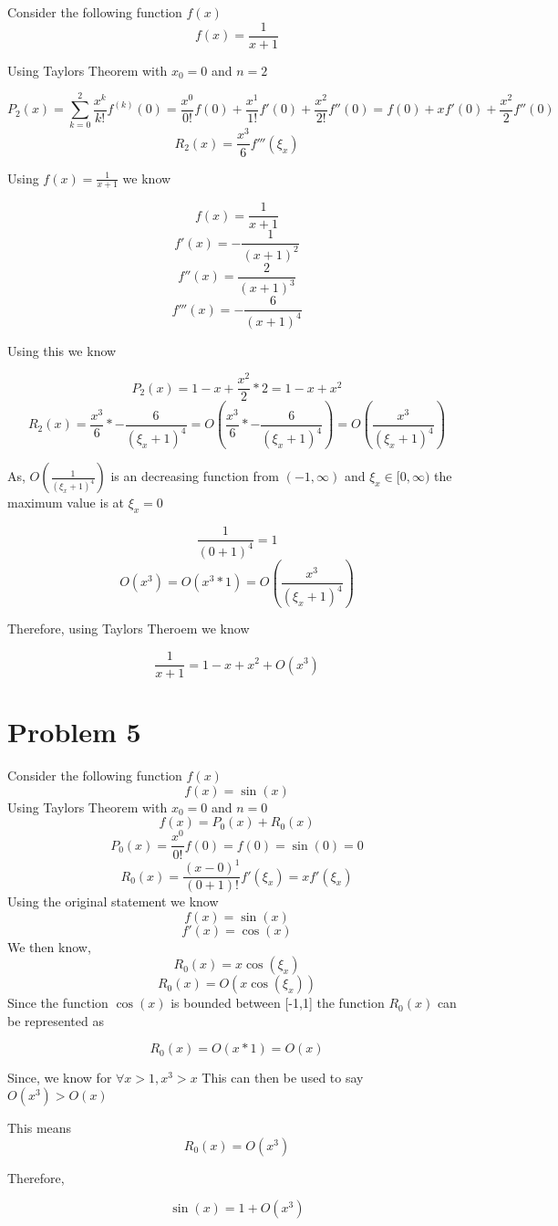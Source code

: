 \documentclass[]{article}
\begin{document}
Consider the following function $f(x)$
\[ f(x) = \frac{1}{x + 1} \]

Using Taylors Theorem with $x_0 = 0$ and $n = 2$

\[P_2(x) = \sum_{k=0}^{2} \frac{x^k}{k!} f^{(k)}(0) = \frac{x^0}{0!} f(0) + \frac{x^{1}}{1!}f'(0) + \frac{x^2}{2!}f''(0)= f(0) + xf'(0) + \frac{x^2}{2}f''(0)\]
\[R_2(x) = {\frac{x^3}{6}f'''(\xi_x)}\]

Using $f(x) = \frac{1}{x+1}$ we know

\[f(x) = \frac{1}{x+1}\]
\[f'(x) = -\frac{1}{(x+1)^2}\]
\[f''(x) = \frac{2}{(x+1)^3}\]
\[f'''(x) = -\frac{6}{(x+1)^4}\]

Using this we know

\[P_2(x) = 1 - x + \frac{x^2}{2}*2 = 1 - x + {x^2}\]
\[R_2(x) = \frac{x^3}{6} * -\frac{6}{(\xi_x+1)^4} = O(\frac{x^3}{6} * -\frac{6}{(\xi_x+1)^4}) = O(\frac{x^3}{(\xi_x+1)^4})\]

As, $ O(\frac{1}{(\xi_x+1)^4})$ is an decreasing function from $(-1 , \infty)$ and $\xi_x \in [0 ,\infty)$ the maximum value is at $\xi_x = 0$

\[\frac{1}{(0+1)^4} = 1\]
\[O(x^3) = O(x^3 * 1) = O(\frac{x^3}{(\xi_x+1)^4})\]

Therefore, using Taylors Theroem we know

\[\frac{1}{x+1} =  1 - x + x^2 + O(x^3)\]



\section*{Problem 5}

Consider the following function $f(x)$
\[ f(x) = \sin{(x)} \]
Using Taylors Theorem with $x_0 = 0$ and $n = 0$
	\[f(x) = P_0(x) + R_0(x)\]
	\[P_0(x)=\frac{x^0}{0!}f(0)=f(0)=\sin(0)=0\]
	\[R_0(x)=\frac{(x-0)^{1}}{(0+1)!}f'(\xi_x) = xf'(\xi_x)\]
Using the original statement we know
\[f(x) = \sin(x)\]	
\[f'(x) = \cos(x)\]	
We then know,
\[R_0(x) = x \cos(\xi_x)\]
\[R_0(x) = O(x \cos(\xi_x))\]
Since the function $\cos(x)$ is bounded between [-1,1] the function $R_0(x)$ can be represented as

\[R_0(x)=O(x * 1) = O(x)\]

Since, we know for $ \forall x > 1, x^3 > x$ This can then be used to say $O(x^3) > O(x)$

This means \[R_0(x) = O(x^3)\]

Therefore,

\[\sin(x) = 1 + O(x^3)\]
\end{document}
